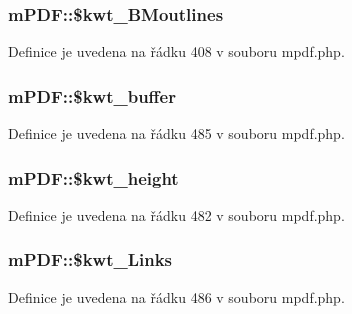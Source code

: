 \hypertarget{classm_p_d_f_a6b7aa4c37bed5d47755f2b08ded822a6}{
\subsubsection[{\$kwt\-\_\-\-B\-Moutlines}]{\setlength{\rightskip}{0pt plus 5cm}m\-P\-D\-F\-::\$kwt\-\_\-\-B\-Moutlines}}\label{classm_p_d_f_a6b7aa4c37bed5d47755f2b08ded822a6}


Definice je uvedena na řádku 408 v souboru mpdf.\-php.

\hypertarget{classm_p_d_f_ab0cf83bf3f4e9c2cf878ab32fdcf54b2}{
\subsubsection[{\$kwt\-\_\-buffer}]{\setlength{\rightskip}{0pt plus 5cm}m\-P\-D\-F\-::\$kwt\-\_\-buffer}}\label{classm_p_d_f_ab0cf83bf3f4e9c2cf878ab32fdcf54b2}


Definice je uvedena na řádku 485 v souboru mpdf.\-php.

\hypertarget{classm_p_d_f_afa152e672f6eacd131f0d00d0b5bdcb4}{
\subsubsection[{\$kwt\-\_\-height}]{\setlength{\rightskip}{0pt plus 5cm}m\-P\-D\-F\-::\$kwt\-\_\-height}}\label{classm_p_d_f_afa152e672f6eacd131f0d00d0b5bdcb4}


Definice je uvedena na řádku 482 v souboru mpdf.\-php.

\hypertarget{classm_p_d_f_aa9c6ede46d025c2092e4efd4b30eb812}{
\subsubsection[{\$kwt\-\_\-\-Links}]{\setlength{\rightskip}{0pt plus 5cm}m\-P\-D\-F\-::\$kwt\-\_\-\-Links}}\label{classm_p_d_f_aa9c6ede46d025c2092e4efd4b30eb812}


Definice je uvedena na řádku 486 v souboru mpdf.\-php.

